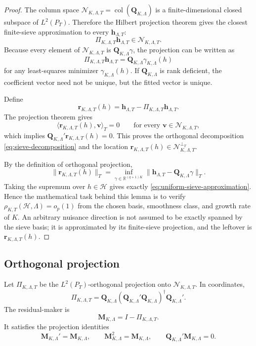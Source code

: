 \documentclass[12pt]{article}
\numberwithin{equation}{section}
\theoremstyle{definition}
\newcommand{\R}{\mathbb R}
\newcommand{\op}{o_p}
\newcommand{\N}{\mathcal N}
\newcommand{\LtwoT}{L^2(P_T)}
\newcommand{\innerT}[2]{\langle #1,#2\rangle_T}
\begin{document}
\begin{proof}
The column space \(\N_{K,\Lambda,T}=\operatorname{col}(\bm Q_{K,\Lambda})\) is a
finite-dimensional closed subspace of \(\LtwoT\). Therefore the Hilbert
projection theorem gives the closest finite-sieve approximation to every
\(\bm h_{\Lambda,T}\):
\[
    \Pi_{K,\Lambda,T}\bm h_{\Lambda,T}
    \in\N_{K,\Lambda,T}.
\]
Because every element of \(\N_{K,\Lambda,T}\) is \(\bm Q_{K,\Lambda}\gamma\), the
projection can be written as
\[
    \Pi_{K,\Lambda,T}\bm h_{\Lambda,T}
    =\bm Q_{K,\Lambda}\gamma_{K,\Lambda}(h)
\]
for any least-squares minimizer \(\gamma_{K,\Lambda}(h)\). If
\(\bm Q_{K,\Lambda}\) is rank deficient, the coefficient vector need not be
unique, but the fitted vector is unique.

Define
\[
    \bm r_{K,\Lambda,T}(h)
    =\bm h_{\Lambda,T}-\Pi_{K,\Lambda,T}\bm h_{\Lambda,T}.
\]
The projection theorem gives
\[
    \innerT{\bm r_{K,\Lambda,T}(h)}{\bm v}=0
    \qquad\text{for every }\bm v\in\N_{K,\Lambda,T},
\]
which implies \(\bm Q_{K,\Lambda}'\bm r_{K,\Lambda,T}(h)=0\). This proves the
orthogonal decomposition \eqref{eq:sieve-decomposition} and the location
\(\bm r_{K,\Lambda,T}(h)\in\N_{K,\Lambda,T}^{\perp_T}\).

By the definition of orthogonal projection,
\[
    \|\bm r_{K,\Lambda,T}(h)\|_T
    =\inf_{\gamma\in\R^{(q+1)K}}
      \|\bm h_{\Lambda,T}-\bm Q_{K,\Lambda}\gamma\|_T.
\]
Taking the supremum over \(h\in\mathcal H\) gives exactly
\eqref{eq:uniform-sieve-approximation}. Hence the mathematical task behind this
lemma is to verify \(\rho_{K,T}(\mathcal H,\Lambda)=\op(1)\) from the chosen
basis, smoothness class, and growth rate of \(K\). An arbitrary nuisance
direction is not assumed to be exactly spanned by the sieve basis; it is
approximated by its finite-sieve projection, and the leftover is
\(\bm r_{K,\Lambda,T}(h)\).
\end{proof}
\subsection{Orthogonal projection}

Let \(\Pi_{K,\Lambda,T}\) be the \(\LtwoT\)-orthogonal projection onto
\(\N_{K,\Lambda,T}\). In coordinates,
\[
    \Pi_{K,\Lambda,T}
    =\bm Q_{K,\Lambda}(\bm Q_{K,\Lambda}'\bm Q_{K,\Lambda})^\dagger
      \bm Q_{K,\Lambda}'.
\]
The residual-maker is
\begin{equation}
    \bm M_{K,\Lambda}=I-\Pi_{K,\Lambda,T}.
    \label{eq:sample-residual-maker}
\end{equation}
It satisfies the projection identities
\[
    \bm M_{K,\Lambda}'=\bm M_{K,\Lambda},
    \qquad
    \bm M_{K,\Lambda}^2=\bm M_{K,\Lambda},
    \qquad
    \bm Q_{K,\Lambda}'\bm M_{K,\Lambda}=0.
\]
\end{document}
